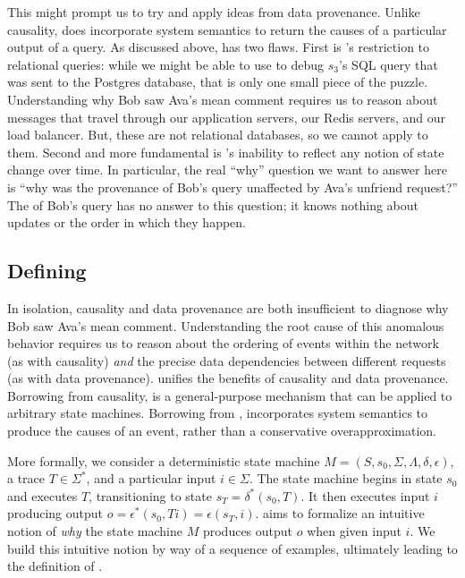 This might prompt us to try and apply ideas from data provenance. Unlike
causality, \whyprovenance{} does incorporate system semantics to return the
causes of a particular output of a query. As discussed above, \whyprovenance{}
has two flaws. First is \whyprovenance{}'s restriction to relational queries:
while we might be able to use \whyprovenance{} to debug $s_3$'s SQL query that
was sent to the Postgres database, that is only one small piece of the puzzle.
Understanding why Bob saw Ava's mean comment requires us to reason about
messages that travel through our application servers, our Redis servers, and
our load balancer. But, these are not relational databases, so we cannot apply
\whyprovenance{} to them. Second and more fundamental is \whyprovenance{}'s
inability to reflect any notion of state change over time. In particular, the
real ``why'' question we want to answer here is ``why was the provenance of
Bob's query unaffected by Ava's unfriend request?'' The \whyprovenance{} of
Bob's query has no answer to this question; it knows nothing about updates or
the order in which they happen.

\subsection{Defining \WatProvenance{}}
In isolation, causality and data provenance are both insufficient to diagnose
why Bob saw Ava's mean comment. Understanding the root cause of this anomalous
behavior requires us to reason about the ordering of events within the network
(as with causality) \emph{and} the precise data dependencies between different
requests (as with data provenance).
%
 unifies the benefits of causality and data
provenance. Borrowing from causality, \watprovenance{} is a general-purpose
mechanism that can be applied to arbitrary state machines. Borrowing from
\whyprovenance{}, \watprovenance{} incorporates system semantics to produce the
causes of an event, rather than a conservative overapproximation.

More formally, we consider a deterministic state machine $M = (S, s_0, \Sigma,
\Lambda, \delta, \epsilon)$, a trace $T \in \Sigma^*$, and a particular input
$i \in \Sigma$. The state machine begins in state $s_0$ and executes $T$,
transitioning to state $s_T = \delta^*(s_0, T)$. It then executes input $i$
producing output $o = \epsilon^*(s_0, Ti) = \epsilon(s_T, i)$. \Watprovenance{}
aims to formalize an intuitive notion of \emph{why} the state machine $M$
produces output $o$ when given input $i$. We build this intuitive notion by way
of a sequence of examples, ultimately leading to the definition of
\watprovenance{}.

